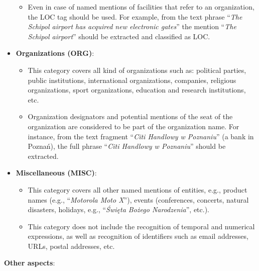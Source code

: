 \documentclass[11pt]{article}
\begin{document}
\begin{itemize}
\begin{itemize}
  \item Even in case of named mentions of facilities that refer to an
    organization, the LOC tag should be used. For example, from the text
    phrase ``\textit{The Schipol airport has acquired new electronic
      gates}'' the mention ``\textit{The Schipol airport}'' should be
    extracted and classified as LOC.

  \end{itemize}

\item \textbf{Organizations (ORG)}:

  \begin{itemize}

  \item This category covers all kind of organizations such as: political
    parties, public institutions, international organizations, companies,
    religious organizations, sport organizations, education and research
    institutions, etc.

  \item Organization designators and potential mentions of the seat of
    the organization are considered to be part of the organization
    name. For instance, from the text fragment ``\textit{Citi Handlowy w
      Poznaniu}'' (a bank in Poznań), the full phrase ``\textit{Citi
      Handlowy w Poznaniu}'' should be extracted.

  \end{itemize}

\item \textbf{Miscellaneous (MISC)}:

  \begin{itemize}

  \item This category covers all other named mentions of entities, e.g.,
    product names (e.g., ``\textit{Motorola Moto X}''), events
    (conferences, concerts, natural disasters, holidays, e.g.,
    ``\textit{Święta Bożego Narodzenia}'', etc.).

  \item This category does not include the recognition of temporal and
    numerical expressions, as well as recognition of identifiers such as
    email addresses, URLs, postal addresses, etc.

  \end{itemize}

\end{itemize}

\noindent \textbf{Other aspects}:
\end{document}
